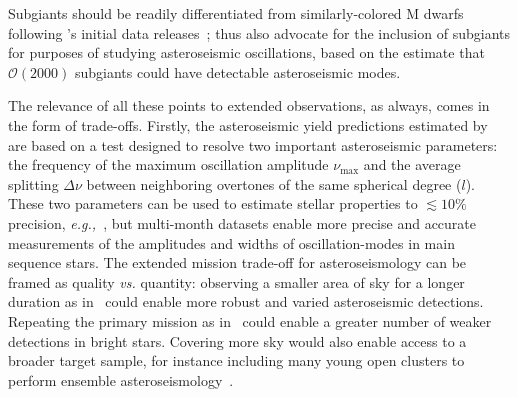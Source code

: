Subgiants should be readily differentiated from similarly-colored M dwarfs following \gaia\!'s initial data releases~\citep{perryman_gaia_2002};
  thus also advocate for the inclusion of subgiants for purposes of studying asteroseismic oscillations, based on the estimate that $\mathcal{O}(2000)$ subgiants could have detectable asteroseismic modes.

The relevance of all these points to extended \tess observations, as always, comes in the form of trade-offs.
Firstly, the asteroseismic yield predictions estimated by~ are based on a test designed to resolve two important asteroseismic parameters: the frequency of the maximum oscillation amplitude $\nu_{\mathrm{max}}$ and the average splitting $\Delta \nu$ between neighboring overtones of the same spherical degree ($l$).
These two parameters can be used to estimate stellar properties to $\lesssim 10\%$ precision, \textit{e.g.,}~\citep{aguirre_verifying_2012}, but multi-month datasets enable more precise and accurate measurements of the amplitudes and widths of oscillation-modes in main sequence stars.
The extended mission trade-off for asteroseismology can be framed as quality \textit{vs.} quantity: observing a smaller area of sky for a longer duration as in \npole\ could enable more robust and varied asteroseismic detections.
Repeating the primary mission as in \nhemi\ could enable a greater number of weaker detections in bright stars.
Covering more sky would also enable access to a broader target sample, for instance including many young open clusters to perform ensemble asteroseismology~\citep{aerts_ensemble_2013}.

\begin{comment}
\paragraph{Measuring rotation periods for a large sample of stars}
Another reason to observing more rather than less sky is to enable measurements of rotation periods for the largest possible sample of stars.
For instance~\citet{nielsen_rotation_2013} reported rotation periods derived from starspot variability for 12151 \kepler stars.
Such studies (cf their introduction) are important for studies of stellar evolution and stellar dynamos.

They also bear upon radial velocity searches for exoplanets, in which stellar activity can effectively `mask' planetary orbital periods commensurate with the stellar rotation period.
The matters for prospects of detecting small planets in the habitable zones of M dwarfs~\citep{newton_HZ_2016}.

THIS ALSO MATTERS FOR STELLAR ACTIVITY STUDIES.
Long timescale characterization of stellar activity
E.g. through spot detection, or other indicators of stellar magnetic activity.
\end{comment}

